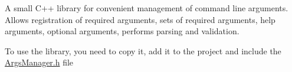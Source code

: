 A small C++ library for convenient management of command line arguments. Allows registration of required arguments, sets of required arguments, help arguments, optional arguments, performs parsing and validation.

To use the library, you need to copy it, add it to the project and include the \mbox{\hyperlink{_args_manager_8h_source}{Args\+Manager.\+h}} file 